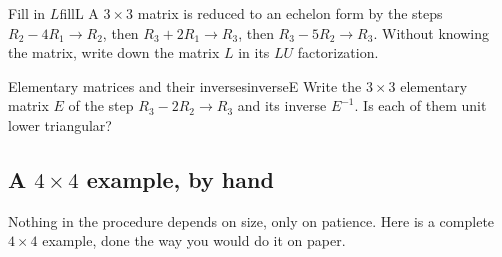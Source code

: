 \documentclass[11pt]{article}
\begin{document}
\begin{kc}{Fill in $L$}{fillL}
A $3\times3$ matrix is reduced to an echelon form by the steps $R_2-4R_1\to R_2$, then $R_3+2R_1\to R_3$, then $R_3-5R_2\to R_3$. Without knowing the matrix, write down the matrix $L$ in its $LU$ factorization.
\end{kc}

\begin{kc}{Elementary matrices and their inverses}{inverseE}
Write the $3\times3$ elementary matrix $E$ of the step $R_3-2R_2\to R_3$ and its inverse $E^{-1}$. Is each of them unit lower triangular?
\end{kc}

\subsection*{A $4\times4$ example, by hand}

Nothing in the procedure depends on size, only on patience. Here is a complete $4\times4$ example, done the way you would do it on paper.
\end{document}

